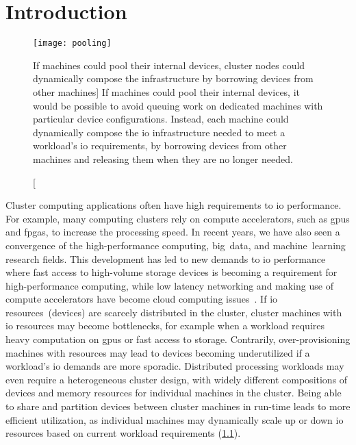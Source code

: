 \chapter{Introduction}\label{chapter:intro}

\begin{figure}
	\centering
	\texttt{[image: pooling]}
    \caption
    [If machines could pool their internal devices, cluster nodes could dynamically compose the  infrastructure by borrowing devices from other machines]
    {If machines could pool their internal devices, it would be possible to avoid queuing work on dedicated machines with particular device configurations. Instead, each machine could dynamically compose the \gls{io} infrastructure needed to meet a workload's \gls{io} requirements, by borrowing devices from other machines and releasing them when they are no longer needed.}
    \label{fig:device-pool}
\end{figure}

Cluster computing applications often have high requirements to \gls{io} performance.
%
For example, many computing clusters rely on compute accelerators, such as \glspl{gpu} and \glspl{fpga}, to increase the processing speed.
%
In recent years, we have also seen a convergence of the high-performance computing, big~data, and machine~learning research fields.
%
This development has led to new demands to \gls{io} performance where fast access to high-volume storage devices is becoming a requirement for high-performance computing, while low latency networking and making use of compute accelerators have become cloud computing issues~\cite{Trivedi2011,Coates2013,Taherkordi2018}.
%
If \gls{io} resources~(devices) are scarcely distributed in the cluster, cluster machines with \gls{io} resources may become bottlenecks, for example when a workload requires heavy computation on \glspl{gpu} or fast access to storage.
%
Contrarily, over-provisioning machines with resources may lead to devices becoming underutilized if a workload's \gls{io} demands are more sporadic.
%
Distributed processing workloads may even require a heterogeneous cluster design, with widely different compositions of devices and memory resources for individual machines in the cluster.
%
Being able to share and partition devices between cluster machines in run-time leads to more efficient utilization, as individual machines may dynamically scale up or down \gls{io} resources based on current workload requirements (\cref{fig:device-pool}).



